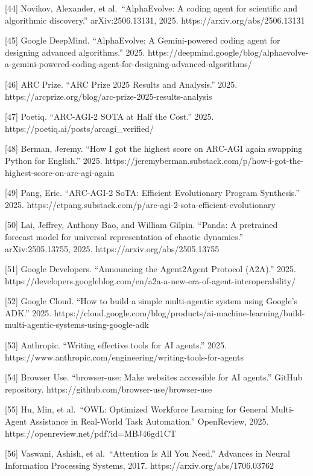 \documentclass[11pt]{article}
\begin{document}
{[}44{]} Novikov, Alexander, et al.~``AlphaEvolve: A coding agent for
scientific and algorithmic discovery.'' arXiv:2506.13131, 2025.
https://arxiv.org/abs/2506.13131

{[}45{]} Google DeepMind. ``AlphaEvolve: A Gemini-powered coding agent
for designing advanced algorithms.'' 2025.
https://deepmind.google/blog/alphaevolve-a-gemini-powered-coding-agent-for-designing-advanced-algorithms/

{[}46{]} ARC Prize. ``ARC Prize 2025 Results and Analysis.'' 2025.
https://arcprize.org/blog/arc-prize-2025-results-analysis

{[}47{]} Poetiq. ``ARC-AGI-2 SOTA at Half the Cost.'' 2025.
https://poetiq.ai/posts/arcagi\_verified/

{[}48{]} Berman, Jeremy. ``How I got the highest score on ARC-AGI again
swapping Python for English.'' 2025.
https://jeremyberman.substack.com/p/how-i-got-the-highest-score-on-arc-agi-again

{[}49{]} Pang, Eric. ``ARC-AGI-2 SoTA: Efficient Evolutionary Program
Synthesis.'' 2025.
https://ctpang.substack.com/p/arc-agi-2-sota-efficient-evolutionary

{[}50{]} Lai, Jeffrey, Anthony Bao, and William Gilpin. ``Panda: A
pretrained forecast model for universal representation of chaotic
dynamics.'' arXiv:2505.13755, 2025. https://arxiv.org/abs/2505.13755

{[}51{]} Google Developers. ``Announcing the Agent2Agent Protocol
(A2A).'' 2025.
https://developers.googleblog.com/en/a2a-a-new-era-of-agent-interoperability/

{[}52{]} Google Cloud. ``How to build a simple multi-agentic system
using Google's ADK.'' 2025.
https://cloud.google.com/blog/products/ai-machine-learning/build-multi-agentic-systems-using-google-adk

{[}53{]} Anthropic. ``Writing effective tools for AI agents.'' 2025.
https://www.anthropic.com/engineering/writing-tools-for-agents

{[}54{]} Browser Use. ``browser-use: Make websites accessible for AI
agents.'' GitHub repository. https://github.com/browser-use/browser-use

{[}55{]} Hu, Min, et al.~``OWL: Optimized Workforce Learning for General
Multi-Agent Assistance in Real-World Task Automation.'' OpenReview,
2025. https://openreview.net/pdf?id=MBJ46gd1CT

{[}56{]} Vaswani, Ashish, et al.~``Attention Is All You Need.'' Advances
in Neural Information Processing Systems, 2017.
https://arxiv.org/abs/1706.03762
\end{document}
